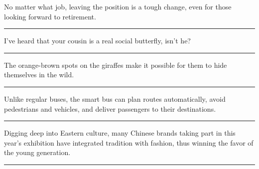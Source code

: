 \documentclass[11pt,a4paper]{article}
\newcommand{\num}[1]{\makebox[1.9em][r]{#1.}\hspace{0.3em}}
\newcommand{\wline}{\noindent\rule{\linewidth}{0.4pt}}
\begin{document}
\begin{minipage}{\linewidth}

\num{24}No matter what job, leaving the position is a tough change, even for those looking forward to retirement.

\vspace{0.25em}

\wline

\end{minipage}

\vspace{0.35em}\vspace{0.15em}

\begin{minipage}{\linewidth}

\num{25}I’ve heard that your cousin is a real social butterfly, isn’t he?

\vspace{0.25em}

\wline

\end{minipage}

\begin{minipage}{\linewidth}

\num{26}The orange-brown spots on the giraffes make it possible for them to hide themselves in the wild.

\vspace{0.25em}

\wline

\end{minipage}

\begin{minipage}{\linewidth}

\num{27}Unlike regular buses, the smart bus can plan routes automatically, avoid pedestrians and vehicles, and deliver passengers to their destinations.

\vspace{0.25em}

\wline

\end{minipage}

\begin{minipage}{\linewidth}

\num{28}Digging deep into Eastern culture, many Chinese brands taking part in this year’s exhibition have integrated tradition with fashion, thus winning the favor of the young generation.

\vspace{0.25em}

\wline

\end{minipage}
\end{document}
